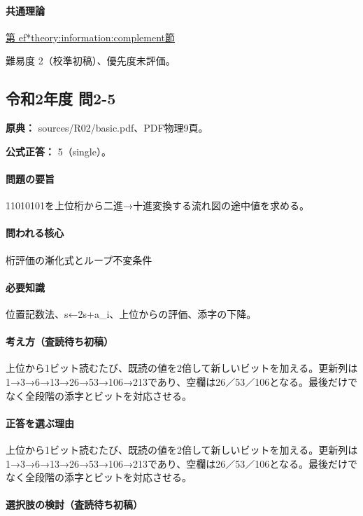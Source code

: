 \paragraph{共通理論} \hyperref[theory:information:complement]{第
ef*{theory:information:complement}節}

\par 難易度 2（校準初稿）、優先度未評価。

\subsection{令和2年度 問2-5}
\label{q:r02-reg-basic-2-5}

\noindent\textbf{原典：} sources/R02/basic.pdf、PDF物理9頁。

\textbf{公式正答：} 5（single）。

\paragraph{問題の要旨} 11010101を上位桁から二進→十進変換する流れ図の途中値を求める。

\paragraph{問われる核心} 桁評価の漸化式とループ不変条件

\paragraph{必要知識} 位置記数法、s←2s+a\_i、上位からの評価、添字の下降。

\paragraph{考え方（査読待ち初稿）} 上位から1ビット読むたび、既読の値を2倍して新しいビットを加える。更新列は1→3→6→13→26→53→106→213であり、空欄は26／53／106となる。最後だけでなく全段階の添字とビットを対応させる。

\paragraph{正答を選ぶ理由} 上位から1ビット読むたび、既読の値を2倍して新しいビットを加える。更新列は1→3→6→13→26→53→106→213であり、空欄は26／53／106となる。最後だけでなく全段階の添字とビットを対応させる。

\paragraph{選択肢の検討（査読待ち初稿）}

